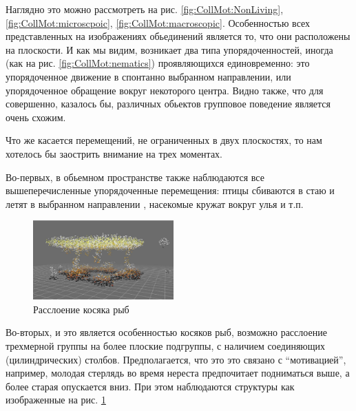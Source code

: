 	Наглядно это можно рассмотреть на рис. \ref{fig:CollMot:NonLiving}, \ref{fig:CollMot:microscpoic}, \ref{fig:CollMot:macroscopic}. Особенностью всех представленных на изображениях обьединений является то, что они расположены на плоскости. И как мы видим, возникает два типа упорядоченностей, иногда (как на рис. \ref{fig:CollMot:nematics}) проявляющихся единовременно: это упорядоченное движение в спонтанно выбранном направлении, или упорядоченное обращение вокруг некоторого центра. Видно также, что для совершенно, казалось бы, различных обьектов групповое поведение является очень схожим.

	Что же касается перемещений, не ограниченных в двух плоскостях, то нам хотелось бы заострить внимание на трех моментах. 

	Во-первых, в обьемном пространстве также наблюдаются все вышеперечисленные упорядоченные перемещения: птицы сбиваются в стаю и летят в выбранном направлении \cite{dellariccia2008}, насекомые кружат вокруг улья \cite{buhl2006} и т.п.

	\begin{figure}
	  \vspace{-20pt}
	  \begin{center}
	    \includegraphics[width=0.48\textwidth]{Fig57_CollectiveMotion}
	  \end{center}
	  \vspace{-20pt}
	  \caption{Расслоение косяка рыб}
	  \label{fig:FishSplitting}
	  \vspace{-10pt}
	\end{figure}

	Во-вторых, и это является особенностью косяков рыб, возможно расслоение трехмерной группы на более плоские подгруппы, с наличием соединяющих (цилиндрических) столбов. Предполагается, что это это связано с ``мотивацией'', например, молодая стерлядь во время нереста предпочитает подниматься выше, а более старая опускается вниз. \cite{axelsen2000} При этом наблюдаются структуры как изображенные на рис. \ref{fig:FishSplitting}

